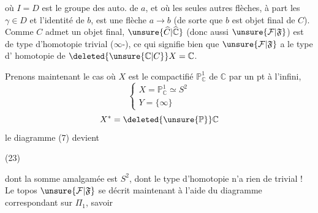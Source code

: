 où $I=D$ est le groupe des auto. de $a$, et où
les seules autres flèches, à part les $\gamma\in D$ et
l'identité de $b$, est une flèche $a\longrightarrow b$ (de
sorte que $b$ est objet final de $C$). Comme
$C$ admet un objet final, $\unsure{\widehat C|\widehat{\mathbb C}}$  (donc aussi
$\unsure{\mathcal F|\mathfrak F}$) est de type d'homotopie trivial ($\infty$-),
ce qui signifie bien que $\unsure{\mathcal F|\mathfrak F}$ a le type d'
homotopie de $\deleted{\unsure{\mathbb C|C}}X=\mathbb C$.

Prenons maintenant le cas où $X$ est le
compactifié $\mathbb P^1_{\mathbb C}$ de $\mathbb C$ par un pt à l'infini,
\[
\left\{\begin{array}{l}
X=\mathbb P^1_{\mathbb C}\simeq S^2\\
Y=\{\infty\}
\end{array}\right.
\]
\[
X^*=\deleted{\unsure{\mathbb P}}\mathbb C
\]
le diagramme (7) devient

\noindent (23)

dont la somme amalgamée est $S^2$, dont
le type d'homotopie n'a rien de trivial !
Le topos $\unsure{\mathcal F|\mathfrak F}$ se décrit maintenant à
l'aide du diagramme correspondant sur  $\Pi_1$,
savoir
